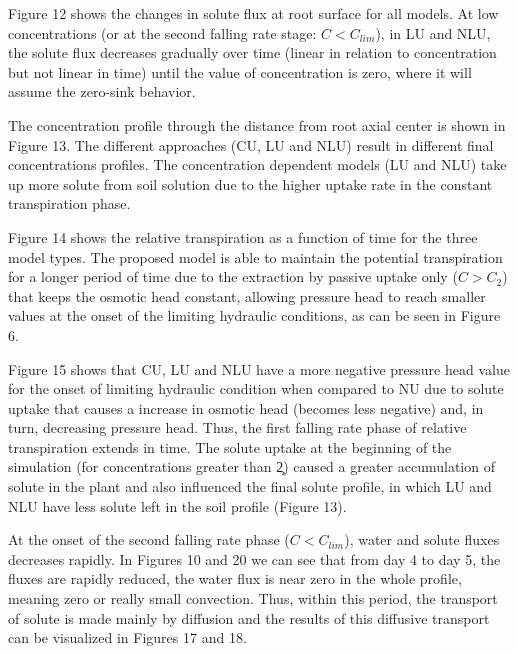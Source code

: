Figure 12 shows the changes in solute flux at root surface for all models. At low concentrations (or at the second falling rate stage: $C<C_{lim}$), in LU and NLU, the solute flux decreases gradually over time (linear in relation to concentration but not linear in time) until the value of concentration is zero, where it will assume the zero-sink behavior.

The concentration profile through the distance from root axial center is shown in Figure 13. The different approaches (CU, LU and NLU) result in different final concentrations profiles. The concentration dependent models (LU and NLU) take up more solute from soil solution due to the higher uptake rate in the constant transpiration phase.

Figure 14 shows the relative transpiration as a function of time for the three model types. The proposed model is able to maintain the potential transpiration for a longer period of time due to the extraction by passive uptake only ($C>C_2$) that keeps the osmotic head constant, allowing pressure head to reach smaller values at the onset of the limiting hydraulic conditions, as can be seen in Figure 6.

Figure 15 shows that CU, LU and NLU have a more negative pressure head value for the onset of limiting hydraulic condition when compared to NU due to solute uptake that causes a increase in osmotic head (becomes less negative) and, in turn, decreasing pressure head. Thus, the first falling rate phase of relative transpiration extends in time. The solute uptake at the beginning of the simulation (for concentrations greater than \c2) caused a greater accumulation of solute in the plant and also influenced the final solute profile, in which LU and NLU have less solute left in the soil profile (Figure 13).

At the onset of the second falling rate phase ($C<C_{lim}$), water and solute fluxes decreases rapidly. In Figures 10 and 20 we can see that from day 4 to day 5, the fluxes are rapidly reduced, the water flux is near zero in the whole profile, meaning zero or really small convection. Thus, within this period, the transport of solute is made mainly by diffusion and the results of this diffusive transport can be visualized in Figures 17 and 18.




